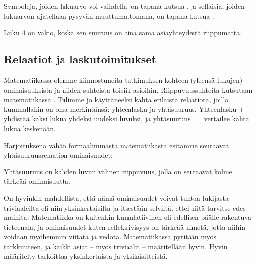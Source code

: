 Symboleja, joiden lukuarvo voi vaihdella, on tapana kutsua , ja sellaisia, joiden lukuarvon ajatellaan pysyvän muuttumattomana, on tapana kutsua .

\begin{esimerkki}
Luku $4$ on vakio, koska sen suuruus on aina sama asiayhteydestä riippumatta.
\end{esimerkki}


\subsection*{Relaatiot ja laskutoimitukset}

Matematiikassa olemme kiinnostuneita tutkimuksen kohteen (yleensä lukujen) ominaisuuksista ja niiden suhteista toisiin asioihin. Riippuvuussuhteita kutsutaan matematiikassa . Tulimme jo käyttäneeksi kahta erilaista relaatiota, joilla kummallakin on oma merkintänsä: yhteenlasku ja yhtäsuuruus. Yhteenlasku $+$ yhdistää kaksi lukua yhdeksi uudeksi luvuksi, ja yhtäsuuruus $=$ vertailee kahta lukua keskenään.

Harjoituksena vähän formaalimmasta matematiikasta esitämme seuraavat yhtäsuuruusrelaation ominaisuudet:

Yhtäsuuruus on kahden luvun välinen riippuvuus, jolla on seuraavat kolme tärkeää ominaisuutta:


\begin{esimerkki}
\end{esimerkki}

On hyvinkin mahdollista, että nämä ominaisuudet voivat tuntua lukijasta triviaaleilta eli niin yksinkertaisilta ja itsestään selviltä, ettei niitä tarvitse edes mainita. Matematiikka on kuitenkin kumulatiivinen eli edellisen päälle rakentuva tieteenala, ja ominaisuudet kuten refleksiivisyys on tärkeää nimetä, jotta niihin voidaan myöhemmin viitata ja vedota. Matematiikassa pyritään myös tarkkuuteen, ja kaikki asiat -- myös triviaalit -- määritellään hyvin. Hyvin määritelty tarkoittaa yksinkertaista ja yksikäsitteistä.

